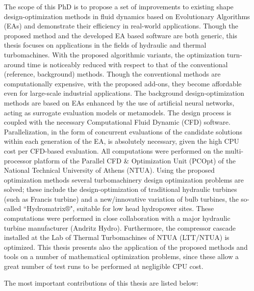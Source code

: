 \cleardoublepage %
\begin{abstractslong}    %

The scope of this PhD is to propose a set of improvements to existing shape design-optimization methods in fluid dynamics based on Evolutionary Algorithms (EAs) and demonstrate their efficiency in real-world applications. Though the proposed method and the developed EA based software are both generic, this thesis focuses on applications in the fields of hydraulic and thermal turbomachines. With the proposed algorithmic variants, the optimization turn-around time is noticeably reduced with respect to that of the conventional (reference, background) methods. Though the conventional methods are computationally expensive, with the proposed add-ons, they become affordable even for large-scale industrial applications. The background design-optimization methods are based on EAs enhanced by the use of artificial neural networks, acting as surrogate evaluation models or metamodels. The design process is coupled with the necessary Computational Fluid Dynamic (CFD) software. Parallelization, in the form of concurrent evaluations of the candidate solutions within each generation of the EA, is absolutely necessary, given the high CPU cost per CFD-based evaluation. All computations were performed on the multi-processor platform of the Parallel CFD \& Optimization Unit (PCOpt) of the National Technical University of Athens (NTUA). Using the proposed optimization methods several turbomachinery design optimization problems are solved; these include the design-optimization of traditional hydraulic turbines (such as Francis turbine) and a new/innovative variation of bulb turbines, the so-called ``Hydromatrix$\circledR$", suitable for low head hydropower sites. These computations were performed in close collaboration with a major hydraulic turbine manufacturer (Andritz Hydro).  Furthermore, the compressor cascade installed at the Lab of Thermal Turbomachines of NTUA (LTT/NTUA) is optimized. This thesis presents also the application of the proposed methods and tools on a number of mathematical optimization problems, since these allow a great number of test runs to be performed at negligible CPU cost.

The most important contributions of this thesis are listed below:
	

\end{abstractslong}
